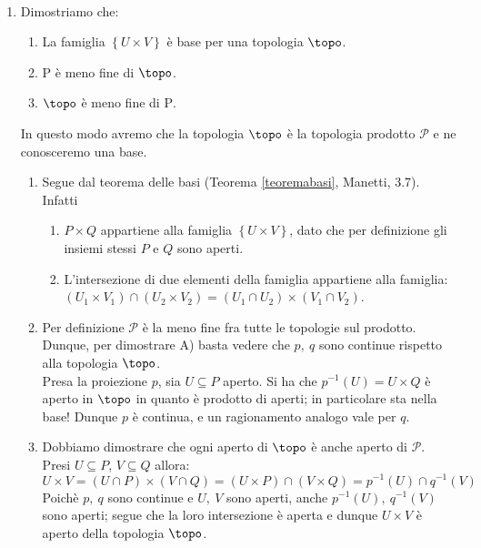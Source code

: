 \begin{demonstration}~{}
\begin{enumerate}[label=\Roman*]
\item Dimostriamo che:
\begin{enumerate}[label=\Alph*)]
\item La famiglia $\left\{U\times V\right\}$ è base per una topologia $\topo$.
\item $\mathrm{P}$ è meno fine di $\topo$.
\item $\topo$ è meno fine di $\mathrm{P}$.
\end{enumerate}
In questo modo avremo che la topologia $\topo$ è la topologia prodotto $\mathcal{P}$ e ne conosceremo una base.
\begin{enumerate}[label=\alph*)]
\item Segue dal teorema delle basi (Teorema \ref{teoremabasi}, Manetti, 3.7). Infatti
\begin{enumerate}
\item $P\times Q$ appartiene alla famiglia $\left\{U\times V\right\}$, dato che per definizione gli insiemi stessi $P$ e $Q$ sono aperti.
\item L'intersezione di due elementi della famiglia appartiene alla famiglia:
$\left(U_1\times V_1\right)\cap\left(U_2\times V_2\right)=\left(U_1\cap U_2\right)\times \left(V_1\cap V_2\right)$.
\end{enumerate}
\item Per definizione $\mathcal{P}$ è la meno fine fra tutte le topologie sul prodotto. Dunque, per dimostrare A) basta vedere che $p,\ q$ sono continue rispetto alla topologia $\topo$.\\
Presa la proiezione $p$, sia $U\subseteq P$ aperto. Si ha che $p^{-1}\left(U\right)=U\times Q$ è aperto in $\topo$ in quanto è prodotto di aperti; in particolare sta nella base! Dunque $p$ è continua, e un ragionamento analogo vale per $q$.
\item Dobbiamo dimostrare che ogni aperto di $\topo$ è anche aperto di $\mathcal{P}$.\\
Presi $U\subseteq P$, $V\subseteq Q$ allora:
\begin{equation*}
U\times V=\left(U\cap P\right)\times\left(V\cap Q\right)=\left(U\times P\right)\cap \left(V\times Q\right)=p^{-1}\left(U\right)\cap q^{-1}\left(V\right)
\end{equation*}
Poichè $p,\ q$ sono continue e $U,\ V$ sono aperti, anche $p^{-1}\left(U\right),\ q^{-1}\left(V\right)$ sono aperti; segue che la loro intersezione è aperta e dunque $U\times V$ è aperto della topologia $\topo$.

\end{enumerate}
\end{enumerate}
\end{demonstration}
